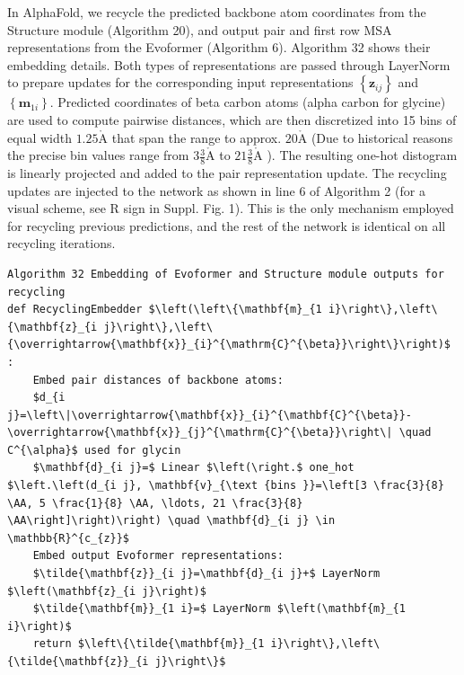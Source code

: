 \documentclass[10pt]{article}
\def\AA{\mathring{\mathrm{A}}}
\begin{document}
In AlphaFold, we recycle the predicted backbone atom coordinates from the Structure module (Algorithm 20), and output pair and first row MSA representations from the Evoformer (Algorithm 6). Algorithm 32 shows their embedding details. Both types of representations are passed through LayerNorm to prepare updates for the corresponding input representations $\left\{\mathbf{z}_{i j}\right\}$ and $\left\{\mathbf{m}_{1 i}\right\}$. Predicted coordinates of beta carbon atoms (alpha carbon for glycine) are used to compute pairwise distances, which are then discretized into 15 bins of equal width $1.25 \AA$ that span the range to approx. $20 \AA$ (Due to historical reasons the precise bin values range from $3 \frac{3}{8} \AA$ to $21 \frac{3}{8} \AA$ ). The resulting one-hot distogram is linearly projected and added to the pair representation update. The recycling updates are injected to the network as shown in line 6 of Algorithm 2 (for a visual scheme, see R sign in Suppl. Fig. 1). This is the only mechanism employed for recycling previous predictions, and the rest of the network is identical on all recycling iterations.

\begin{verbatim}
Algorithm 32 Embedding of Evoformer and Structure module outputs for recycling
def RecyclingEmbedder $\left(\left\{\mathbf{m}_{1 i}\right\},\left\{\mathbf{z}_{i j}\right\},\left\{\overrightarrow{\mathbf{x}}_{i}^{\mathrm{C}^{\beta}}\right\}\right)$ :
    Embed pair distances of backbone atoms:
    $d_{i j}=\left\|\overrightarrow{\mathbf{x}}_{i}^{\mathbf{C}^{\beta}}-\overrightarrow{\mathbf{x}}_{j}^{\mathrm{C}^{\beta}}\right\| \quad C^{\alpha}$ used for glycin
    $\mathbf{d}_{i j}=$ Linear $\left(\right.$ one_hot $\left.\left(d_{i j}, \mathbf{v}_{\text {bins }}=\left[3 \frac{3}{8} \AA, 5 \frac{1}{8} \AA, \ldots, 21 \frac{3}{8} \AA\right]\right)\right) \quad \mathbf{d}_{i j} \in \mathbb{R}^{c_{z}}$
    Embed output Evoformer representations:
    $\tilde{\mathbf{z}}_{i j}=\mathbf{d}_{i j}+$ LayerNorm $\left(\mathbf{z}_{i j}\right)$
    $\tilde{\mathbf{m}}_{1 i}=$ LayerNorm $\left(\mathbf{m}_{1 i}\right)$
    return $\left\{\tilde{\mathbf{m}}_{1 i}\right\},\left\{\tilde{\mathbf{z}}_{i j}\right\}$
\end{verbatim}
\end{document}
